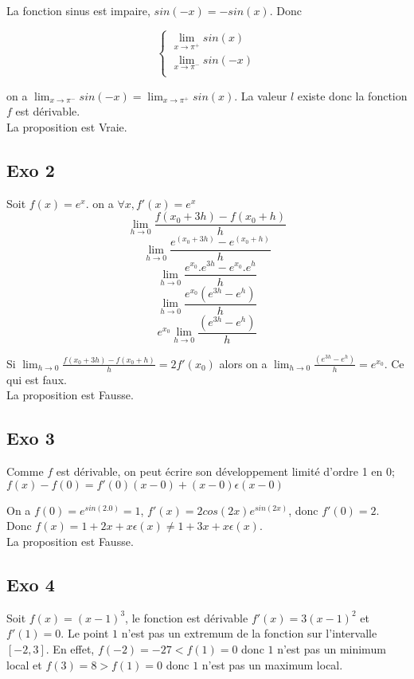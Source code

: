 \documentclass[]{book}
\theoremstyle{definition}
\begin{document}
La fonction sinus est impaire, $sin(-x) = -sin(x)$. Donc

$$ 
\left\{ 
\begin{array}{l}
 \lim_{x \to \pi^{+}} sin(x) \\
 \lim_{x \to \pi^{-}} sin(-x) \\
\end{array}
\right. 
$$

on a $\lim_{x \to \pi^{-}} sin(-x) = \lim_{x \to \pi^{+}} sin(x)$. La valeur $l$ existe donc la fonction $f$ est d\'erivable.\\

La proposition est Vraie.

\subsection*{Exo 2}

Soit $f(x) = e^{x}$. on a $\forall x, f'(x) = e^{x}$
$$\lim_{h \to 0}\frac{f(x_0+3h)-f(x_0+h)}{h}$$
$$\lim_{h \to 0}\frac{e^{(x_0+3h)} - e^{(x_0+h)}}{h}$$
$$\lim_{h \to 0}\frac{e^{x_0}.e^{3h} - e^{x_0}.e^{h}}{h}$$
$$\lim_{h \to 0}\frac{e^{x_0}(e^{3h}-e^{h})}{h}$$
$$e^{x_0}\lim_{h \to 0}\frac{(e^{3h}-e^{h})}{h}$$

Si $\lim_{h \to 0}\frac{f(x_0+3h)-f(x_0+h)}{h} = 2f'(x_0)$ alors on a $\lim_{h \to 0}\frac{(e^{3h}-e^{h})}{h} = e^{x_0}$. Ce qui est faux.\\

La proposition est Fausse.

\subsection*{Exo 3}
Comme $f$ est d\'erivable, on peut \'ecrire son d\'eveloppement limit\'e d'ordre 1 en $0$; $f(x) - f(0) = f'(0)(x - 0) + (x - 0)\epsilon(x - 0)$

On a $f(0) = e^{sin(2.0)} = 1$, $f'(x) = 2cos(2x)e^{sin(2x)}$, donc $f'(0) = 2$. Donc $f(x) = 1 + 2x + x\epsilon(x) \neq 1 + 3x + x\epsilon(x) $.\\

La proposition est Fausse.


\subsection*{Exo 4}
Soit $f(x) = (x-1)^3$, le fonction est d\'erivable $f'(x)=3(x-1)^2$ et $f'(1) = 0$. Le point $1$ n'est pas un extremum de la fonction sur l'intervalle $[-2,3]$. En effet, $f(-2) = -27 < f(1) = 0$ donc $1$ n'est pas un minimum local et $f(3) = 8 > f(1) = 0$ donc $1$ n'est pas un maximum local.\\
\end{document}
